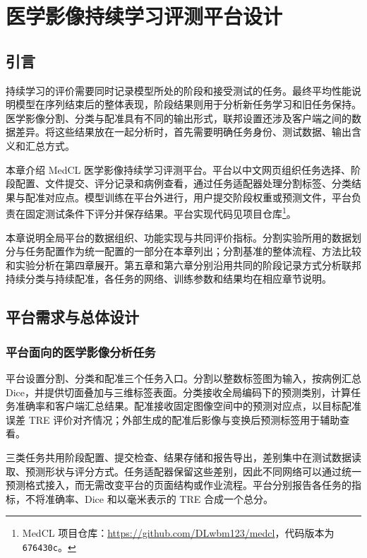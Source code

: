 \chapter{医学影像持续学习评测平台设计}
\label{chap:benchmark}
\label{chap:medcl}
\setlength{\emergencystretch}{1em}

\section{引言}
\label{sec:benchmark-introduction}


持续学习的评价需要同时记录模型所处的阶段和接受测试的任务。最终平均性能说明模型在序列结束后的整体表现，阶段结果则用于分析新任务学习和旧任务保持。医学影像分割、分类与配准具有不同的输出形式，联邦设置还涉及客户端之间的数据差异。将这些结果放在一起分析时，首先需要明确任务身份、测试数据、输出含义和汇总方式。

本章介绍 MedCL 医学影像持续学习评测平台。平台以中文网页组织任务选择、阶段配置、文件提交、评分记录和病例查看，通过任务适配器处理分割标签、分类结果与配准对应点。模型训练在平台外进行，用户提交阶段权重或预测文件，平台负责在固定测试条件下评分并保存结果。平台实现代码见项目仓库\footnote{MedCL 项目仓库：\url{https://github.com/DLwbm123/medcl}，代码版本为 \texttt{676430c}。}。

本章说明全局平台的数据组织、功能实现与共同评价指标。分割实验所用的数据划分与任务配置作为统一配置的一部分在本章列出；分割基准的整体流程、方法比较和实验分析在第四章展开。第五章和第六章分别沿用共同的阶段记录方式分析联邦持续分类与持续配准，各任务的网络、训练参数和结果均在相应章节说明。

\section{平台需求与总体设计}
\label{sec:medcl-design}


\subsection{平台面向的医学影像分析任务}
\label{subsec:medcl-task-scope}

平台设置分割、分类和配准三个任务入口。分割以整数标签图为输入，按病例汇总 Dice，并提供切面叠加与三维标签表面。分类接收全局编码下的预测类别，计算任务准确率和客户端汇总结果。配准接收固定图像空间中的预测对应点，以目标配准误差 TRE 评价对齐情况；外部生成的配准后影像与变换后预测标签用于辅助查看。

三类任务共用阶段配置、提交检查、结果存储和报告导出，差别集中在测试数据读取、预测形状与评分方式。任务适配器保留这些差别，因此不同网络可以通过统一预测格式接入，而无需改变平台的页面结构或作业流程。平台分别报告各任务的指标，不将准确率、Dice 和以毫米表示的 TRE 合成一个总分。

